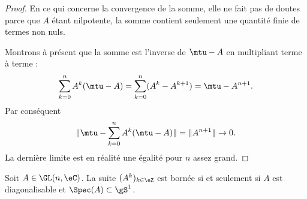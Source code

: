 \begin{proof}
    En ce qui concerne la convergence de la somme, elle ne fait pas de doutes parce que \( A\) étant nilpotente, la somme contient seulement une quantité finie de termes non nuls.

    Montrons à présent que la somme est l'inverse de \( \mtu-A\) en multipliant terme à terme :
    \begin{equation}
        \sum_{k=0}^nA^k(\mtu-A)=\sum_{k=0}^n(A^k-A^{k+1})=\mtu-A^{n+1}.
    \end{equation}
    Par conséquent 
    \begin{equation}
        \| \mtu-\sum_{k=0}^nA^k(\mtu-A) \|=\| A^{n+1} \|\to 0.
    \end{equation}
    La dernière limite est en réalité une égalité pour \( n\) assez grand.
\end{proof}

\begin{proposition}
    Soit \( A\in\GL(n,\eC)\). La suite \( (A^k)_{k\in \eZ}\) est bornée si et seulement si \( A\) est diagonalisable et \( \Spec(A)\subset \gS^1\).
\end{proposition}

